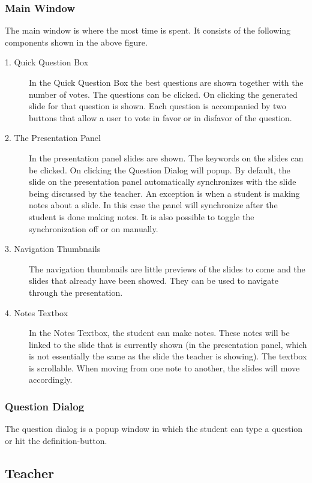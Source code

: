 \documentclass[11pt]{article}
\begin{document}
\subsubsection{Main Window}
The main window is where the most time is spent. It consists of the following components shown in the above figure.
\begin{description}
\item[1. Quick Question Box] In the Quick Question Box the best questions are shown together with the number of votes. The questions can be clicked. On clicking the generated slide for that question is shown. Each question is accompanied by two buttons that allow a user to vote in favor or in disfavor of the question. 

\item[2. The Presentation Panel] In the presentation panel slides are shown. The keywords on the slides can be clicked. On clicking the Question Dialog will popup. By default, the slide on the presentation panel automatically synchronizes with the slide being discussed by the teacher. An exception is when a student is making notes about a slide. In this case the panel will synchronize after the student is done making notes. It is also possible to toggle the synchronization off or on manually.  

\item[3. Navigation Thumbnails] The navigation thumbnails are little previews of the slides to come and the slides that already have been showed. They can be used to navigate through the presentation.

\item[4. Notes Textbox] In the Notes Textbox, the student can make notes. These notes will be linked to the slide that is currently shown (in the presentation panel, which is not essentially the same as the slide the teacher is showing). The textbox is scrollable. When moving from one note to another, the slides will move accordingly. 
\end{description}

\subsubsection{Question Dialog}
The question dialog is a popup window in which the student can type a question or hit the definition-button.

\subsection{Teacher}
\end{document}
